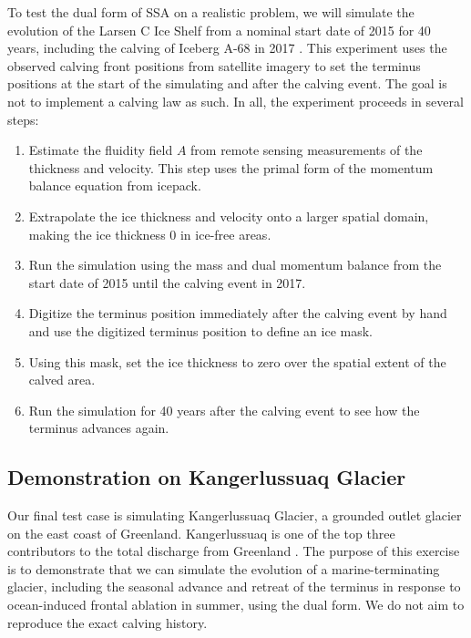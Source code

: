\documentclass[review,oneside]{igs}
\begin{document}
To test the dual form of SSA on a realistic problem, we will simulate the evolution of the Larsen C Ice Shelf from a nominal start date of 2015 for 40 years, including the calving of Iceberg A-68 in 2017 \citep{larour2021physical}.
This experiment uses the observed calving front positions from satellite imagery to set the terminus positions at the start of the simulating and after the calving event.
The goal is not to implement a calving law as such.
In all, the experiment proceeds in several steps:
\begin{enumerate}
    \item Estimate the fluidity field $A$ from remote sensing measurements of the thickness and velocity.
        This step uses the primal form of the momentum balance equation from icepack.
    \item Extrapolate the ice thickness and velocity onto a larger spatial domain, making the ice thickness 0 in ice-free areas.
    \item Run the simulation using the mass and dual momentum balance from the start date of 2015 until the calving event in 2017.
    \item Digitize the terminus position immediately after the calving event by hand and use the digitized terminus position to define an ice mask.
    \item Using this mask, set the ice thickness to zero over the spatial extent of the calved area.
    \item Run the simulation for 40 years after the calving event to see how the terminus advances again.
\end{enumerate}


\subsection{Demonstration on Kangerlussuaq Glacier}

Our final test case is simulating Kangerlussuaq Glacier, a grounded outlet glacier on the east coast of Greenland.
Kangerlussuaq is one of the top three contributors to the total discharge from Greenland \citep{enderlin2014improved, mouginot2019forty}.
The purpose of this exercise is to demonstrate that we can simulate the evolution of a marine-terminating glacier, including the seasonal advance and retreat of the terminus in response to ocean-induced frontal ablation in summer, using the dual form.
We do not aim to reproduce the exact calving history.
\end{document}
